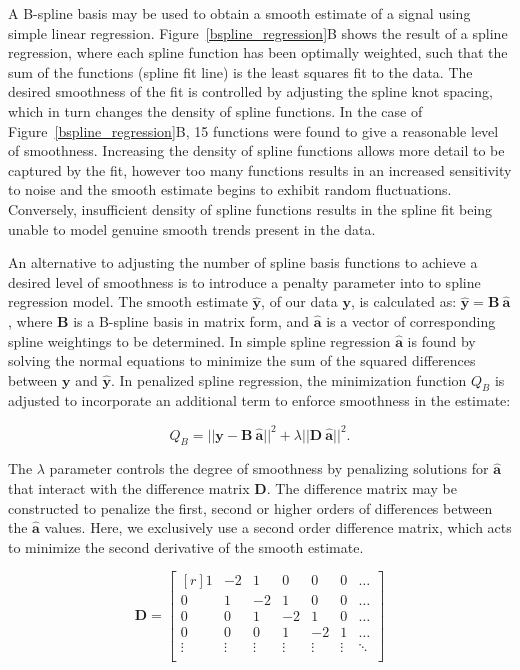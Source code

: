 \documentclass[num-refs]{wiley-article}
\begin{document}
A B-spline basis may be used to obtain a smooth estimate of a signal using simple linear regression. Figure~\ref{bspline_regression}B shows the result of a spline regression, where each spline function has been optimally weighted, such that the sum of the functions (spline fit line) is the least squares fit to the data. The desired smoothness of the fit is controlled by adjusting the spline knot spacing, which in turn changes the density of spline functions. In the case of Figure~\ref{bspline_regression}B, 15 functions were found to give a reasonable level of smoothness. Increasing the density of spline functions allows more detail to be captured by the fit, however too many functions results in an increased sensitivity to noise and the smooth estimate begins to exhibit random fluctuations. Conversely, insufficient density of spline functions results in the spline fit being unable to model genuine smooth trends present in the data.

An alternative to adjusting the number of spline basis functions to achieve a desired level of smoothness is to introduce a penalty parameter into to spline regression model. The smooth estimate $\hat{\mathbf{y}}$, of our data $\mathbf{y}$, is calculated as: $\hat{\mathbf{y}} = \mathbf{B} \ \hat{\mathbf{a}}$, where $\mathbf{B}$ is a B-spline basis in matrix form, and $\hat{\mathbf{a}}$ is a vector of corresponding spline weightings to be determined. In simple spline regression $\hat{\mathbf{a}}$ is found by solving the normal equations to minimize the sum of the squared differences between $\mathbf{y}$ and $\hat{\mathbf{y}}$. In penalized spline regression, the minimization function $Q_B$ is adjusted to incorporate an additional term to enforce smoothness in the estimate:

\begin{equation}
  Q_{B} = ||\mathbf{y} - \mathbf{B} \ \hat{\mathbf{a}} ||^{2} + \lambda ||\mathbf{D} \ \hat{\mathbf{a}}||^{2}.
  \label{qb}
\end{equation}

The $\lambda$ parameter controls the degree of smoothness by penalizing solutions for $\hat{\mathbf{a}}$ that interact with the difference matrix $\mathbf{D}$. The difference matrix may be constructed to penalize the first, second or higher orders of differences between the $\hat{\mathbf{a}}$ values. Here, we exclusively use a second order difference matrix, which acts to minimize the second derivative of the smooth estimate.

\begin{equation}
  \mathbf{D} =
  \begin{bmatrix*}[r]
    1 & -2 &  1 &  0 &  0 &  0 & \dots \\
    0 &  1 & -2 &  1 &  0 &  0 & \dots \\
    0 &  0 &  1 & -2 &  1 &  0 & \dots \\
    0 &  0 &  0 &  1 & -2 &  1 & \dots \\
    \vdots & \vdots & \vdots & \vdots & \vdots & \vdots & \ddots \\
  \end{bmatrix*}
  \label{d_mat}
\end{equation}
\end{document}

